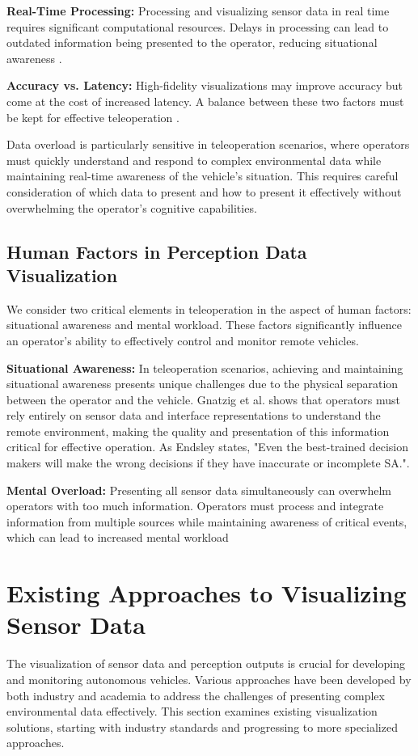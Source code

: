 \textbf{Real-Time Processing:} Processing and visualizing sensor data in real time requires significant computational resources. Delays in processing can lead to outdated information being presented to the operator, reducing situational awareness \cite{Gnatzig}.

\textbf{Accuracy vs. Latency:} High-fidelity visualizations may improve accuracy but come at the cost of increased latency. A balance between these two factors must be kept for effective teleoperation \cite{chucholowski2014teleoperated}.

Data overload is particularly sensitive in teleoperation scenarios, where operators must quickly understand and respond to complex environmental data while maintaining real-time awareness of the vehicle's situation. This requires careful consideration of which data to present and how to present it effectively without overwhelming the operator's cognitive capabilities.

\subsection{Human Factors in Perception Data Visualization}
We consider two critical elements in teleoperation in the aspect of human factors: situational awareness and mental workload. These factors significantly influence an operator's ability to effectively control and monitor remote vehicles.

\textbf{Situational Awareness:} In teleoperation scenarios, achieving and maintaining situational awareness presents unique challenges due to the physical separation between the operator and the vehicle. Gnatzig et al. \cite{Gnatzig} shows that operators must rely entirely on sensor data and interface representations to understand the remote environment, making the quality and presentation of this information critical for effective operation.  As Endsley \cite{endsley1995toward} states, "Even the
best-trained decision makers will make the wrong decisions if they have inaccurate or incomplete SA.".

\textbf{Mental Overload:} Presenting all sensor data simultaneously can overwhelm operators with too much information.
Operators must process and integrate information from multiple sources while maintaining awareness of critical events, which can lead to increased mental workload \cite{wickens2008multiple}

\section{Existing Approaches to Visualizing Sensor Data}
The visualization of sensor data and perception outputs is crucial for developing and monitoring autonomous vehicles. Various approaches have been developed by both industry and academia to address the challenges of presenting complex environmental data effectively. This section examines existing visualization solutions, starting with industry standards and progressing to more specialized approaches.
